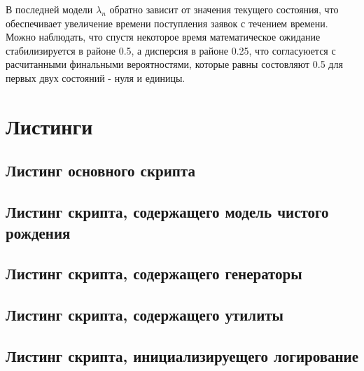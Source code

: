 В последней модели $\lambda_n$ обратно зависит от значения текущего состояния, что обеспечивает увеличение времени поступления
заявок с течением времени.
Можно наблюдать, что спустя некоторое время математическое ожидание стабилизируется в районе 0.5, а дисперсия в районе
0.25, что согласуюется с расчитанными финальными вероятностями, которые равны состовляют 0.5 для первых двух состояний -
нуля и единицы.

\section*{Листинги}

\subsection*{Листинг основного скрипта}


\subsection*{Листинг скрипта, содержащего модель чистого рождения}


\subsection*{Листинг скрипта, содержащего генераторы}


\subsection*{Листинг скрипта, содержащего утилиты}


\subsection*{Листинг скрипта, инициализируещего логирование}

